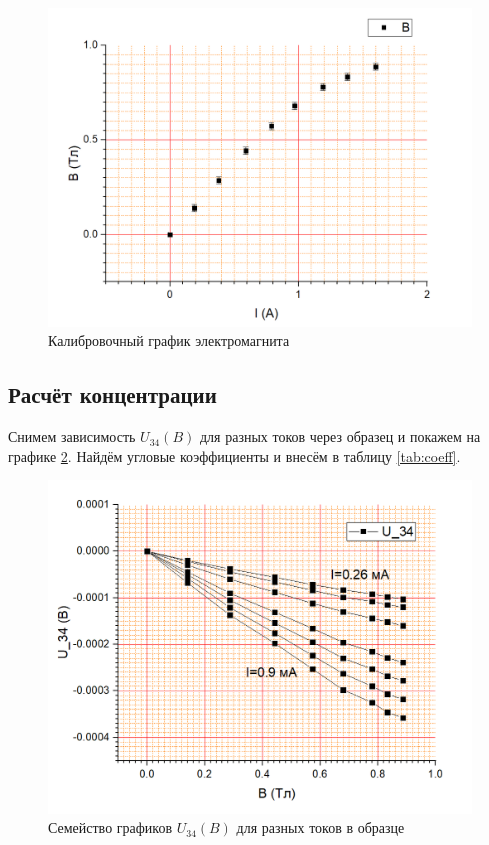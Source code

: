 \documentclass[a4paper]{article}
\begin{document}
\begin{figure}
	\centering
	\includegraphics[width=0.8\linewidth]{"калибровочный график"}
	\caption{Калибровочный график электромагнита}
	\label{fig:caibre}
\end{figure}

\subsection{Расчёт концентрации}

Снимем зависимость $ U_{3 4}(B) $ для разных токов через образец и покажем на графике \ref{fig:EDS}. Найдём угловые коэффициенты и внесём в таблицу \ref{tab:coeff}.

\begin{figure}
	\centering
	\includegraphics[width=0.8\linewidth]{"график ЭДС"}
	\caption{Семейство графиков $U_{3 4}(B) $ для разных токов в образце}
	\label{fig:EDS}
\end{figure}
\end{document}
